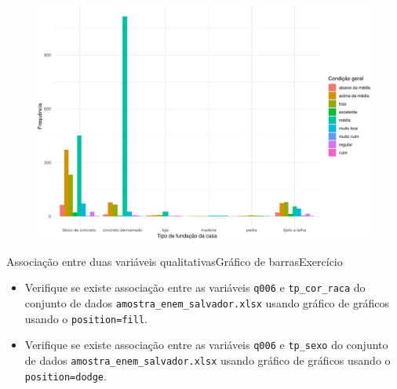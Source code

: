 \documentclass[
  10pt,
  ignorenonframetext,
]{beamer}
\providecommand{\tightlist}{%
  \setlength{\itemsep}{0pt}\setlength{\parskip}{0pt}}\usepackage{longtable,booktabs,array}
\begin{document}
\begin{frame}
\begin{figure}

{\centering \includegraphics[width=1\textwidth,height=\textheight]{exploracao-visualizacao_files/figure-beamer/unnamed-chunk-137-1.pdf}

}

\end{figure}
\end{frame}

\begin{frame}[fragile]{Associação entre duas variáveis
qualitativas\newline Gráfico de barras\newline Exercício}
\protect\hypertarget{associauxe7uxe3o-entre-duas-variuxe1veis-qualitativasgruxe1fico-de-barrasexercuxedcio}{}
\begin{itemize}
\tightlist
\item
  Verifique se existe associação entre as variáveis \texttt{q006} e
  \texttt{tp\_cor\_raca} do conjunto de dados
  \texttt{amostra\_enem\_salvador.xlsx} usando gráfico de gráficos
  usando o \texttt{position=fill}.
\item
  Verifique se existe associação entre as variáveis \texttt{q006} e
  \texttt{tp\_sexo} do conjunto de dados
  \texttt{amostra\_enem\_salvador.xlsx} usando gráfico de gráficos
  usando o \texttt{position=dodge}.
\end{itemize}
\end{frame}
\end{document}
